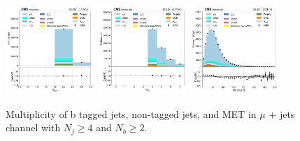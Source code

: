 \begin{figure}[htb!]
    \centering
    \includegraphics[width=0.3\textwidth]{chapters/Analysis/sectionPlots/figures/data_mc_overlays/mujet_2016_cat_gt4_gt2_signal_linear_jet_n_bjets}
    \includegraphics[width=0.3\textwidth]{chapters/Analysis/sectionPlots/figures/data_mc_overlays/mujet_2016_cat_gt4_gt2_signal_linear_jet_n_jets}
    \includegraphics[width=0.3\textwidth]{chapters/Analysis/sectionPlots/figures/data_mc_overlays/mujet_2016_cat_gt4_gt2_signal_linear_misc_met_mag}
    \caption{Multiplicity of b tagged jets, non-tagged jets, and MET in
    $\mu$ + jets channel with $N_{j} \geq 4$ and $N_{b} \geq 2$.
    \label{fig:analysis:plots:mujet_2_jetmet}}
\end{figure}
